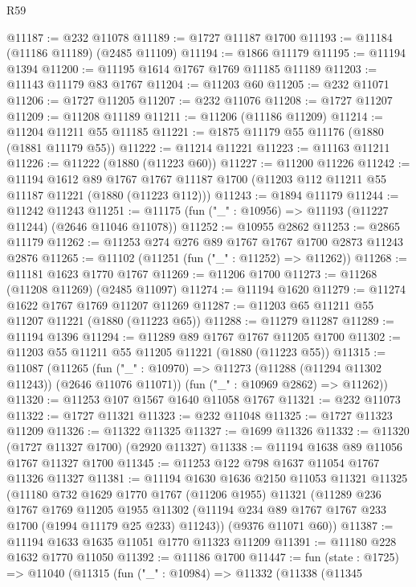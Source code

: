 \begin{lexlean}{R59}
\begin{coremodule}
@11187 := @232 @11078
@11189 := @1727 @11187 @1700
@11193 := @11184 (@11186 @11189) (@2485 @11109)
@11194 := @1866 @11179
@11195 := @11194 @1394
@11200 := @11195 @1614 @1767 @1769 @11185 @11189
@11203 := @11143 @11179 @83 @1767
@11204 := @11203 @60
@11205 := @232 @11071
@11206 := @1727 @11205
@11207 := @232 @11076
@11208 := @1727 @11207
@11209 := @11208 @11189
@11211 := @11206 (@11186 @11209)
@11214 := @11204 @11211 @55 @11185
@11221 := @1875 @11179 @55 @11176 (@1880 (@1881 @11179 @55))
@11222 := @11214 @11221
@11223 := @11163 @11211
@11226 := @11222 (@1880 (@11223 @60))
@11227 := @11200 @11226
@11242 := @11194
    @1612
    @89
    @1767
    @1767
    @11187
    @1700
    (@11203 @112 @11211 @55 @11187 @11221 (@1880 (@11223 @112)))
@11243 := @1894 @11179
@11244 := @11242 @11243
@11251 := @11175 (fun ("_" : @10956) => @11193 (@11227 @11244) (@2646 @11046 @11078))
@11252 := @10955 @2862
@11253 := @2865 @11179
@11262 := @11253 @274 @276 @89 @1767 @1767 @1700 @2873 @11243 @2876
@11265 := @11102 (@11251 (fun ("_" : @11252) => @11262))
@11268 := @11181 @1623 @1770 @1767
@11269 := @11206 @1700
@11273 := @11268 (@11208 @11269) (@2485 @11097)
@11274 := @11194 @1620
@11279 := @11274 @1622 @1767 @1769 @11207 @11269
@11287 := @11203 @65 @11211 @55 @11207 @11221 (@1880 (@11223 @65))
@11288 := @11279 @11287
@11289 := @11194 @1396
@11294 := @11289 @89 @1767 @1767 @11205 @1700
@11302 := @11203 @55 @11211 @55 @11205 @11221 (@1880 (@11223 @55))
@11315 := @11087
    (@11265
      (fun ("_" : @10970) => @11273 (@11288 (@11294 @11302 @11243)) (@2646 @11076 @11071))
      (fun ("_" : @10969 @2862) => @11262))
@11320 := @11253 @107 @1567 @1640 @11058 @1767
@11321 := @232 @11073
@11322 := @1727 @11321
@11323 := @232 @11048
@11325 := @1727 @11323 @11209
@11326 := @11322 @11325
@11327 := @1699 @11326
@11332 := @11320 (@1727 @11327 @1700) (@2920 @11327)
@11338 := @11194 @1638 @89 @11056 @1767 @11327 @1700
@11345 := @11253 @122 @798 @1637 @11054 @1767 @11326 @11327
@11381 := @11194
    @1630
    @1636
    @2150
    @11053
    @11321
    @11325
    (@11180
      @732
      @1629
      @1770
      @1767
      (@11206 @1955)
      @11321
      (@11289
        @236
        @1767
        @1769
        @11205
        @1955
        @11302
        (@11194 @234 @89 @1767 @1767 @233 @1700 (@1994 @11179 @25 @233) @11243))
      (@9376 @11071 @60))
@11387 := @11194 @1633 @1635 @11051 @1770 @11323 @11209
@11391 := @11180 @228 @1632 @1770 @11050
@11392 := @11186 @1700
@11447 := fun (state : @1725) =>
  @11040
    (@11315
      (fun ("_" : @10984) =>
      @11332
        (@11338
          (@11345

\end{coremodule}
\end{lexlean}
